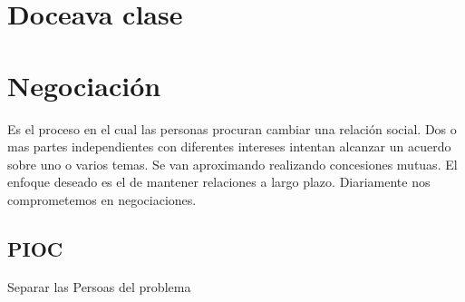 \documentclass[titlepage,a4paper]{article}
\begin{document}
%
%


\section*{Doceava clase}
\section{Negociación}

Es el proceso en el cual las personas procuran cambiar una relación social. Dos o mas partes independientes con diferentes intereses intentan alcanzar un acuerdo sobre uno o varios temas. Se van aproximando realizando concesiones mutuas. El enfoque deseado es el de mantener relaciones a largo plazo. Diariamente nos comprometemos en negociaciones.

\subsection*{PIOC}
Separar las Persoas del problema
\end{document}
